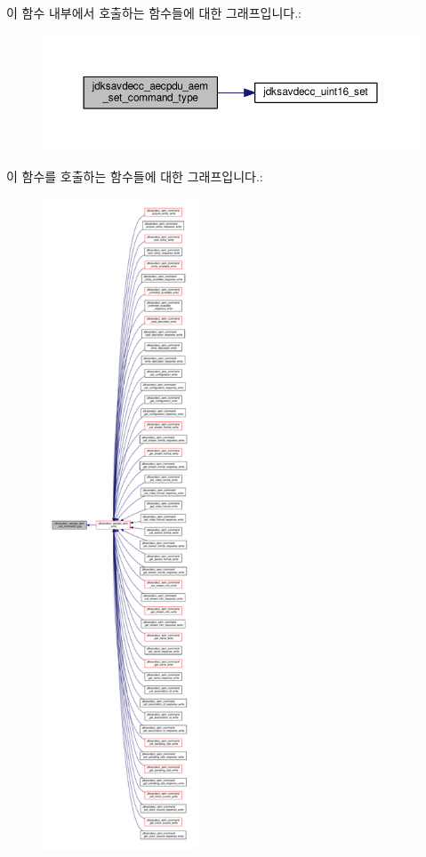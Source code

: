 이 함수 내부에서 호출하는 함수들에 대한 그래프입니다.\+:
\nopagebreak
\begin{figure}[H]
\begin{center}
\leavevmode
\includegraphics[width=350pt]{group__aecpdu__aem_ga844e26b1a57d3b1e674be0f6f1bb2815_cgraph}
\end{center}
\end{figure}




이 함수를 호출하는 함수들에 대한 그래프입니다.\+:
\nopagebreak
\begin{figure}[H]
\begin{center}
\leavevmode
\includegraphics[height=550pt]{group__aecpdu__aem_ga844e26b1a57d3b1e674be0f6f1bb2815_icgraph}
\end{center}
\end{figure}


